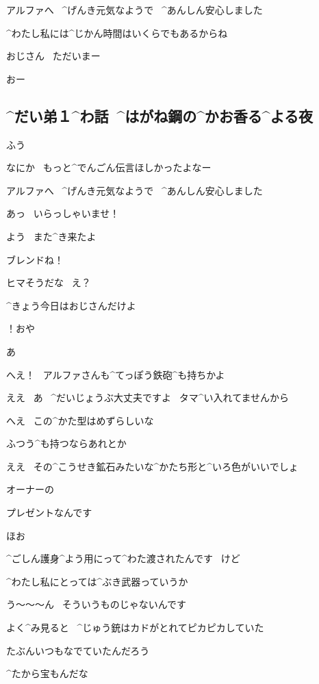\page
\Sign アルファへ
\ ^{げんき}{元気}なようで
\ ^{あんしん}{安心}しました

\Alpha ^{わたし}{私}には^{じかん}{時間}はいくらでもあるからね

\Alpha おじさん
\ ただいまー

\Ojisan おー


\subsection{^{だい}{弟}１^{わ}{話}\ ^{はがね}{鋼}の^{かお}{香}る^{よる}{夜}}

\page[29]
\Alpha ふう

\Alpha なにか
\ もっと^{でんごん}{伝言}ほしかったよなー

\Sign アルファへ
\ ^{げんき}{元気}なようで
\ ^{あんしん}{安心}しました

\Alpha あっ
\ いらっしゃいませ！

\Ojisan よう
\ また^{き}{来}たよ

\Alpha ブレンドね！

\page
\Ojisan ヒマそうだな
\ え？

\Alpha ^{きょう}{今日}はおじさんだけよ

\Ojisan ！おや

\Alpha あ

\Ojisan へえ！
\ アルファさんも^{てっぽう}{鉄砲}^{も}{持}ちかよ

\Alpha ええ
\ あ
\ ^{だいじょうぶ}{大丈夫}ですよ
\ タマ^{い}{入}れてませんから

\Ojisan へえ
\ この^{かた}{型}はめずらしいな

\Ojisan ふつう^{も}{持}つならあれとか

\page
\Ojisan ええ
\ その^{こうせき}{鉱石}みたいな^{かたち}{形}と^{いろ}{色}がいいでしょ

\Alpha オーナーの

\Alpha プレゼントなんです

\Ojisan ほお

\Alpha ^{ごしん}{護身}^{よう}{用}にって^{わた}{渡}されたんです
\ けど

\Alpha ^{わたし}{私}にとっては^{ぶき}{武器}っていうか

\page
\Alpha う〜〜〜ん
\ そういうものじゃないんです

\Ojisan よく^{み}{見}ると
\ ^{じゅう}{銃}はカドがとれてピカピカしていた

\Ojisan たぶんいつもなでていたんだろう

\Ojisan ^{たから}{宝}もんだな

